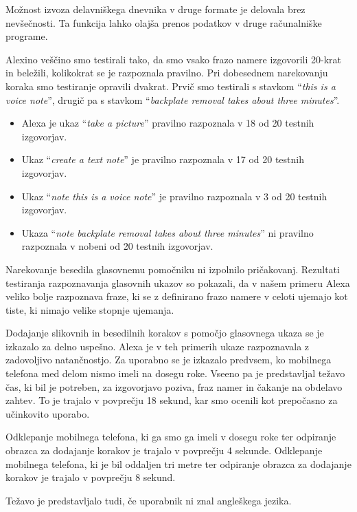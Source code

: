\documentclass[a4paper, 12pt]{book}
\begin{document}
Možnost izvoza delavniškega dnevnika v druge formate je delovala brez nevšečnosti.
Ta funkcija lahko olajša prenos podatkov v druge računalniške programe.

\bigbreak

Alexino veščino smo testirali tako, da smo vsako frazo namere izgovorili 20-krat in beležili, kolikokrat se je razpoznala pravilno.
Pri dobesednem narekovanju koraka smo testiranje opravili dvakrat.
Prvič smo testirali s stavkom \enquote{\textit{this is a voice note}}, drugič pa s stavkom \enquote{\textit{backplate removal takes about three minutes}}.
\begin{itemize}
	\item Alexa je ukaz \enquote{\textit{take a picture}} pravilno razpoznala v 18 od 20 testnih izgovorjav.
	\item Ukaz \enquote{\textit{create a text note}} je pravilno razpoznala v 17 od 20 testnih izgovorjav.
	\item Ukaz \enquote{\textit{note this is a voice note}} je pravilno razpoznala v 3 od 20 testnih izgovorjav.
	\item Ukaza \enquote{\textit{note backplate removal takes about three minutes}} ni pravilno razpoznala v nobeni od 20 testnih izgovorjav.
\end{itemize}
Narekovanje besedila glasovnemu pomočniku ni izpolnilo pričakovanj.
Rezultati testiranja razpoznavanja glasovnih ukazov so pokazali, da v našem primeru Alexa veliko bolje razpoznava fraze, ki se z definirano frazo namere v celoti ujemajo kot tiste, ki nimajo velike stopnje ujemanja.

Dodajanje slikovnih in besedilnih korakov s pomočjo glasovnega ukaza se je izkazalo za delno uspešno.
Alexa je v teh primerih ukaze razpoznavala z zadovoljivo natančnostjo.
Za uporabno se je izkazalo predvsem, ko mobilnega telefona med delom nismo imeli na dosegu roke.
Vseeno pa je predstavljal težavo čas, ki bil je potreben, za izgovorjavo poziva, fraz namer in čakanje na obdelavo zahtev.
To je trajalo v povprečju 18 sekund, kar smo ocenili kot prepočasno za učinkovito uporabo.

Odklepanje mobilnega telefona, ki ga smo ga imeli v dosegu roke ter odpiranje obrazca za dodajanje korakov je trajalo v povprečju 4 sekunde.
Odklepanje mobilnega telefona, ki je bil oddaljen tri metre ter odpiranje obrazca za dodajanje korakov je trajalo v povprečju 8 sekund.

Težavo je predstavljalo tudi, če uporabnik ni znal angleškega jezika.
\end{document}
